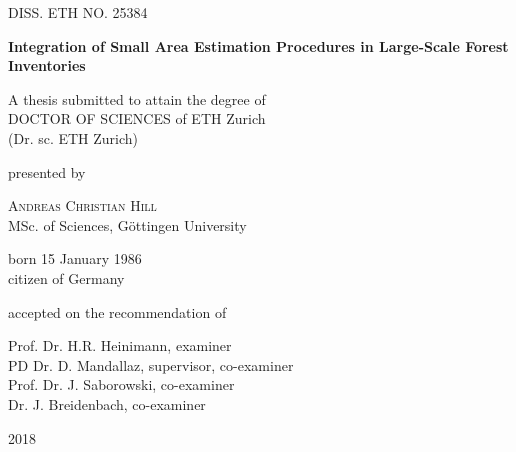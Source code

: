 

\begin{titlepage}

\begin{center}

\textsc{DISS. ETH NO. 25384}

\vspace*{2cm}
\Large
\textbf{Integration of Small Area Estimation Procedures in Large-Scale Forest Inventories} %

\vspace*{1cm}
A thesis submitted to attain the degree of \\
\vspace*{1cm}
DOCTOR OF SCIENCES of ETH Zurich \\
(Dr. sc. ETH Zurich)

\vspace*{1cm}
presented by

\vspace*{0.5cm}
\textsc{Andreas Christian Hill} \\
MSc. of Sciences, G{\"o}ttingen University

born 15 January 1986 \\
citizen of Germany

\vspace*{1cm}
accepted on the recommendation of

\vspace*{0.2cm}
Prof. Dr. H.R. Heinimann, examiner\\
PD Dr. D. Mandallaz, supervisor, co-examiner\\
Prof. Dr. J. Saborowski, co-examiner\\
Dr. J. Breidenbach, co-examiner

\vspace{3cm}
2018


\end{center}

\end{titlepage}